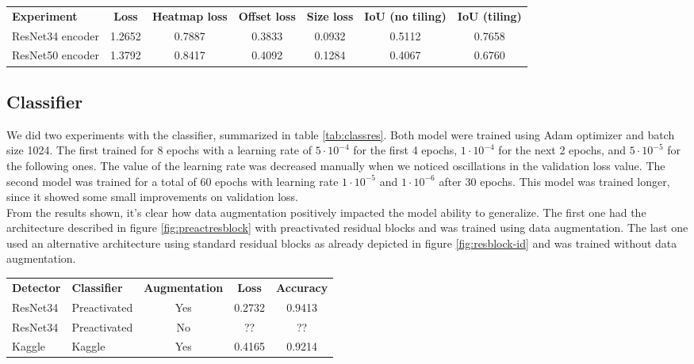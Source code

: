 \begin{table*}
	\begin{tabular}{lcccccc}
		\rowcolor[HTML]{EFEFEF} 
		\textbf{Experiment}   & \textbf{Loss} & \textbf{Heatmap loss} & \textbf{Offset loss} & \textbf{Size loss} & \textbf{IoU (no tiling)} & \textbf{IoU (tiling)} \\
		ResNet34 encoder      & 1.2652        & 0.7887                & 0.3833               & 0.0932             & 0.5112                   & 0.7658                \\
		ResNet50 encoder      & 1.3792        & 0.8417                & 0.4092               & 0.1284             & 0.4067                   & 0.6760
	\end{tabular}
	\caption{Experiments with two residual architecture for detection. The first one uses ResNet34 as an encoder, the second one uses the deeper ResNet50.}
	\label{tab:expdetector}
\end{table*}

\subsection{Classifier}
\label{ssec:classifierexp}

We did two experiments with the classifier, summarized in table \ref{tab:classres}. Both model were trained using Adam optimizer and batch size 1024. The first trained for 8 epochs with a learning rate of $5 \cdot 10^{-4}$ for the first 4 epochs, $1 \cdot 10^{-4}$ for the next 2 epochs, and $5 \cdot 10^{-5}$ for the following ones. The value of the learning rate was decreased manually when we noticed oscillations in the validation loss value. The second model was trained for a total of 60 epochs with learning rate $1 \cdot 10^{-5}$ and $1 \cdot 10^{-6}$ after 30 epochs. This model was trained longer, since it showed some small improvements on validation loss.\\ From the results shown, it's clear how data augmentation positively impacted the model ability to generalize. The first one had the architecture described in figure \ref{fig:preactresblock} with preactivated residual blocks and was trained using data augmentation. The last one used an alternative architecture using standard residual blocks as already depicted in figure \ref{fig:resblock-id} and was trained without data augmentation.

\begin{table*}[h]
	\begin{tabular}{llccc}
		\rowcolor[HTML]{EFEFEF} 
		\textbf{Detector} & \textbf{Classifier} & \textbf{Augmentation} & \textbf{Loss} & \textbf{Accuracy} \\
		ResNet34          & Preactivated        & Yes                   & 0.2732        & 0.9413            \\
		ResNet34          & Preactivated        & No                    & ??        &  ??           \\
		Kaggle          & Kaggle    & Yes                   & 0.4165           & 0.9214               
	\end{tabular}
	\caption{Experiments with data augmentation on classifier.}
	\label{tab:classres}
\end{table*}